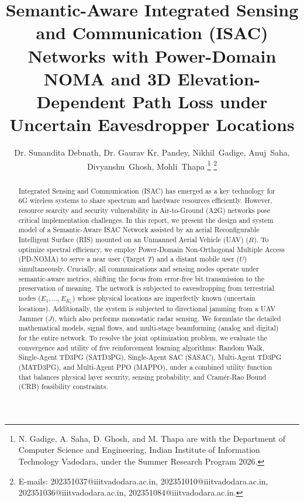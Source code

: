 \documentclass[journal,onecolumn]{IEEEtran}
\begin{document}
\title{Semantic-Aware Integrated Sensing and Communication (ISAC) Networks with Power-Domain NOMA and 3D Elevation-Dependent Path Loss under Uncertain Eavesdropper Locations}

\author{
Dr. Sunandita Debnath, Dr. Gaurav Kr. Pandey,
Nikhil~Gadige,
Anuj~Saha,
Divyanshu~Ghosh,
Mohli~Thapa%
\thanks{N. Gadige, A. Saha, D. Ghosh, and M. Thapa are with the Department of Computer Science and Engineering, Indian Institute of Information Technology Vadodara, under the Summer Research Program 2026.}%
\thanks{E-mails: 202351037@iiitvadodara.ac.in, 202351010@iiitvadodara.ac.in, 202351036@iiitvadodara.ac.in, 202351084@iiitvadodara.ac.in.}
}

\maketitle

\begin{abstract}
Integrated Sensing and Communication (ISAC) has emerged as a key technology for 6G wireless systems to share spectrum and hardware resources efficiently. However, resource scarcity and security vulnerability in Air-to-Ground (A2G) networks pose critical implementation challenges. In this report, we present the design and system model of a Semantic-Aware ISAC Network assisted by an aerial Reconfigurable Intelligent Surface (RIS) mounted on an Unmanned Aerial Vehicle (UAV) ($R$). To optimize spectral efficiency, we employ Power-Domain Non-Orthogonal Multiple Access (PD-NOMA) to serve a near user (Target $T$) and a distant mobile user ($U$) simultaneously. Crucially, all communications and sensing nodes operate under semantic-aware metrics, shifting the focus from error-free bit transmission to the preservation of meaning. The network is subjected to eavesdropping from terrestrial nodes ($E_1, \dots, E_{K_e}$) whose physical locations are imperfectly known (uncertain locations). Additionally, the system is subjected to directional jamming from a UAV Jammer ($J$), which also performs monostatic radar sensing. We formulate the detailed mathematical models, signal flows, and multi-stage beamforming (analog and digital) for the entire network. To resolve the joint optimization problem, we evaluate the convergence and utility of five reinforcement learning algorithms: Random Walk, Single-Agent TD3PG (SATD3PG), Single-Agent SAC (SASAC), Multi-Agent TD3PG (MATD3PG), and Multi-Agent PPO (MAPPO), under a combined utility function that balances physical layer security, sensing probability, and Cram\'{e}r-Rao Bound (CRB) feasibility constraints.
\end{abstract}
\end{document}
